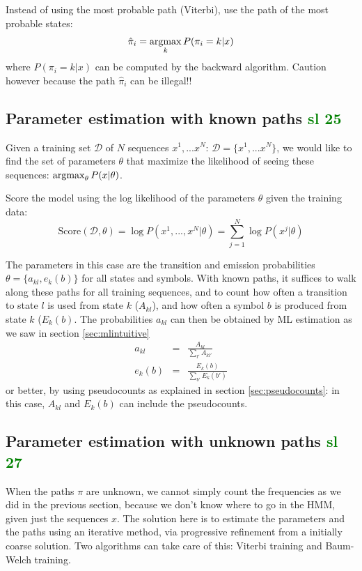 Instead of using the most probable path (Viterbi), use the path of the most probable states:
\begin{equation}
\hat{\pi}_i = \argmax_k P(\pi_i = k | x)
\end{equation}
where $P(\pi_i = k | x)$ can be computed by the backward algorithm. Caution however because the path $\hat{\pi}_i$ can be illegal!!

\subsection{Parameter estimation with known paths \textcolor{green}{sl 25}}

Given a training set $\mathcal{D}$ of $N$ sequences $x^1, ... x^N$: 
$\mathcal{D} = \{ x^1, ... x^N \}$,
we would like to find the set of parameters $\theta$ that maximize the likelihood of seeing these sequences: $\argmax_\theta P(x|\theta)$.

Score the model using the log likelihood of the parameters $\theta$ given the training data:
\begin{equation}
\text{Score}(\mathcal{D},\theta) = \log P(x^1, ... , x^N | \theta) 
                           = \sum_{j=1}^N \log P(x^j | \theta)
\end{equation}

The parameters in this case are the transition and emission probabilities $\theta = \{ a_{kl}, e_k(b) \}$ for all states and symbols. With known paths, it suffices to walk along these paths for all training sequences, and to count how often a transition to state $l$ is used from state $k$ ($A_{kl}$), and how often a symbol $b$ is produced from state $k$ ($E_k(b)$. The probabilities $a_{kl}$ can then be obtained by ML estimation as we saw in section \ref{sec:mlintuitive}
\begin{eqnarray}
a_{kl} & = & \frac{A_{kl}}{\sum_{l'} A_{kl'}}
\label{eq:akl}
\\
e_k(b) & = & \frac{E_k(b)}{\sum_{b'} E_k(b')}
\label{eq:ekb}
\end{eqnarray}
or better, by using pseudocounts as explained in section \ref{sec:pseudocounts}: in this case, $A_{kl}$ and $E_k(b)$ can include the pseudocounts.

\subsection{Parameter estimation with unknown paths \textcolor{green}{sl 27}}

When the paths $\pi$ are unknown, we cannot simply count the frequencies as we did in the previous section, because we don't know where to go in the HMM, given just the sequences $x$. The solution here is to estimate the parameters and the paths using an iterative method, via progressive refinement from a initially coarse solution. Two algorithms can take care of this: Viterbi training and Baum-Welch training.

